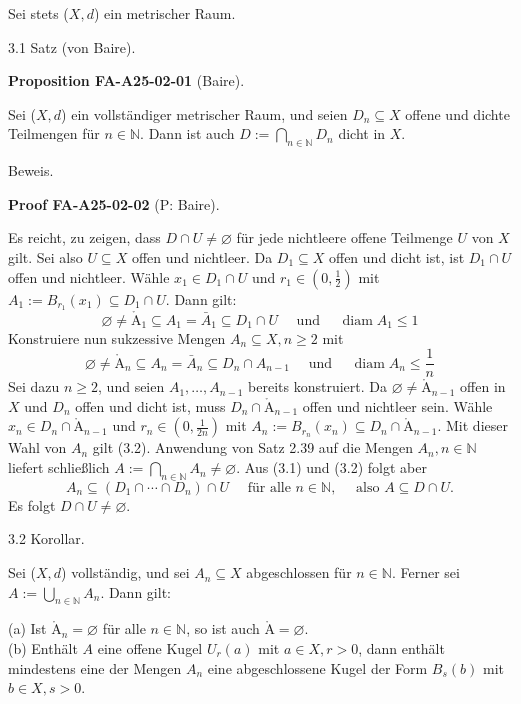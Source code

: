 \documentclass[10pt, letterpaper]{article}
\newcommand{\CustomHeading}[3]{%
  \par\medskip\noindent%
  \textbf{#1 #2} \textnormal{(#3)}.\enskip%
}
\newenvironment{PROP}[2]{\begin{unitbox}\CustomHeading{Proposition}{#1}{#2}}{\end{unitbox}}
\newenvironment{PROOF}[2]{\begin{unitbox}\CustomHeading{Proof}{#1}{#2}}{\end{unitbox}}
\def\AA{\mathring{\mathrm{A}}}
\begin{document}
Sei stets ($X,d$) ein metrischer Raum.


3.1 Satz (von Baire). 

\begin{PROP}{FA-A25-02-01}{Baire}
Sei ($X,d$) ein vollständiger metrischer Raum, und seien $D_{n} \subseteq X$ offene und dichte Teilmengen für $n \in \mathbb{N}$. Dann ist auch $D:=\bigcap_{n \in \mathbb{N}} D_{n}$ dicht in $X$.
\end{PROP}

Beweis. 

\begin{PROOF}{FA-A25-02-02}{P: Baire}
Es reicht, zu zeigen, dass $D \cap U \neq \varnothing$ für jede nichtleere offene Teilmenge $U$ von $X$ gilt. Sei also $U \subseteq X$ offen und nichtleer. Da $D_{1} \subseteq X$ offen und dicht ist, ist $D_{1} \cap U$ offen und nichtleer. Wähle $x_{1} \in D_{1} \cap U$ und $r_{1} \in\left(0, \frac{1}{2}\right)$ mit $A_{1}:=B_{r_{1}}\left(x_{1}\right) \subseteq D_{1} \cap U$. Dann gilt:
$$
\varnothing \neq \AA_{1} \subseteq A_{1}=\bar{A}_{1} \subseteq D_{1} \cap U \quad \text { und } \quad \operatorname{diam} A_{1} \leq 1
$$
Konstruiere nun sukzessive Mengen $A_{n} \subseteq X, n \geq 2$ mit
$$
\varnothing \neq \AA_{n} \subseteq A_{n}=\bar{A}_{n} \subseteq D_{n} \cap A_{n-1} \quad \text { und } \quad \operatorname{diam} A_{n} \leq \frac{1}{n}
$$
Sei dazu $n \geq 2$, und seien $A_{1}, \ldots, A_{n-1}$ bereits konstruiert. Da $\varnothing \neq \AA_{n-1}$ offen in $X$ und $D_{n}$ offen und dicht ist, muss $D_{n} \cap \AA_{n-1}$ offen und nichtleer sein. Wähle $x_{n} \in D_{n} \cap \AA_{n-1}$ und $r_{n} \in\left(0, \frac{1}{2 n}\right)$ mit $A_{n}:=B_{r_{n}}\left(x_{n}\right) \subseteq D_{n} \cap \AA_{n-1}$. Mit dieser Wahl von $A_{n}$ gilt (3.2). Anwendung von Satz 2.39 auf die Mengen $A_{n}, n \in \mathbb{N}$ liefert schließlich $A:=\bigcap_{n \in \mathbb{N}} A_{n} \neq \varnothing$. Aus (3.1) und (3.2) folgt aber
$$
A_{n} \subseteq\left(D_{1} \cap \cdots \cap D_{n}\right) \cap U \quad \text { für alle } n \in \mathbb{N}, \quad \text { also } A \subseteq D \cap U .
$$
Es folgt $D \cap U \neq \varnothing$.
\end{PROOF}


3.2 Korollar. 

Sei ($X,d$) vollständig, und sei $A_{n} \subseteq X$ abgeschlossen für $n \in \mathbb{N}$. Ferner sei $A:=\bigcup_{n \in \mathbb{N}} A_{n}$. Dann gilt:

(a) Ist $\AA_{n}=\varnothing$ für alle $n \in \mathbb{N}$, so ist auch $\AA=\varnothing$.\\
(b) Enthält $A$ eine offene Kugel $U_{r}(a)$ mit $a \in X, r>0$, dann enthält mindestens eine der Mengen $A_{n}$ eine abgeschlossene Kugel der Form $B_{s}(b)$ mit $b \in X, s>0$.
\end{document}
